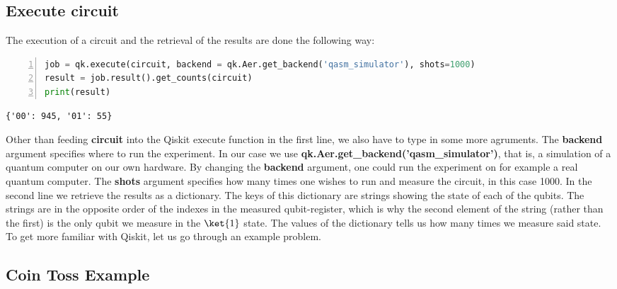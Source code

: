 \subsection{Execute circuit}
The execution of a circuit and the retrieval of the results are done the following way:
\begin{lstlisting}[language=Python,numbers=left]
job = qk.execute(circuit, backend = qk.Aer.get_backend('qasm_simulator'), shots=1000)
result = job.result().get_counts(circuit)
print(result)
\end{lstlisting}

\begin{verbatim}
{'00': 945, '01': 55}
\end{verbatim}
Other than feeding \textbf{circuit} into the Qiskit execute function in the first line, we also have to type in some more agruments. The \textbf{backend} argument specifies where to run the experiment. In our case we use \textbf{qk.Aer.get\_backend('qasm\_simulator')}, that is, a simulation of a quantum computer on our own hardware. By changing the \textbf{backend} argument, one could run the experiment on for example a real quantum computer. The \textbf{shots} argument specifies how many times one wishes to run and measure the circuit, in this case 1000.
In the second line we retrieve the results as a dictionary. The keys of this dictionary are strings showing the state of each of the qubits. The strings are in the opposite order of the indexes in the measured qubit-register, which is why the second element of the string (rather than the first) is the only qubit we measure in the $\ket{1}$ state. The values of the dictionary tells us how many times we measure said state. To get more familiar with Qiskit, let us go through an example problem.

\subsection{Coin Toss Example}
\label{subsec:QiskitCoinTossExample}

